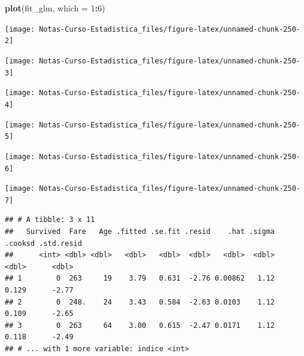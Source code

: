 \documentclass[
  12pt,
]{book}
\newenvironment{Shaded}{\begin{snugshade}}{\end{snugshade}}
\newcommand{\DataTypeTok}[1]{\textcolor[rgb]{0.13,0.29,0.53}{#1}}
\newcommand{\DecValTok}[1]{\textcolor[rgb]{0.00,0.00,0.81}{#1}}
\newcommand{\KeywordTok}[1]{\textcolor[rgb]{0.13,0.29,0.53}{\textbf{#1}}}
\newcommand{\NormalTok}[1]{#1}
\newcommand{\OperatorTok}[1]{\textcolor[rgb]{0.81,0.36,0.00}{\textbf{#1}}}
\newcommand{\StringTok}[1]{\textcolor[rgb]{0.31,0.60,0.02}{#1}}
\theoremstyle{definition}
\theoremstyle{definition}
\theoremstyle{definition}
\theoremstyle{remark}
\begin{document}
\begin{Shaded}
\begin{Highlighting}[]
\KeywordTok{plot}\NormalTok{(fit_glm, }\DataTypeTok{which =} \DecValTok{1}\OperatorTok{:}\DecValTok{6}\NormalTok{)}
\end{Highlighting}
\end{Shaded}

\begin{center}\texttt{[image: Notas-Curso-Estadistica\_files/figure-latex/unnamed-chunk-250-2]} \end{center}

\begin{center}\texttt{[image: Notas-Curso-Estadistica\_files/figure-latex/unnamed-chunk-250-3]} \end{center}

\begin{center}\texttt{[image: Notas-Curso-Estadistica\_files/figure-latex/unnamed-chunk-250-4]} \end{center}

\begin{center}\texttt{[image: Notas-Curso-Estadistica\_files/figure-latex/unnamed-chunk-250-5]} \end{center}

\begin{center}\texttt{[image: Notas-Curso-Estadistica\_files/figure-latex/unnamed-chunk-250-6]} \end{center}

\begin{center}\texttt{[image: Notas-Curso-Estadistica\_files/figure-latex/unnamed-chunk-250-7]} \end{center}

\begin{Shaded}
\end{Shaded}

\begin{verbatim}
## # A tibble: 3 x 11
##   Survived  Fare   Age .fitted .se.fit .resid    .hat .sigma .cooksd .std.resid
##      <int> <dbl> <dbl>   <dbl>   <dbl>  <dbl>   <dbl>  <dbl>   <dbl>      <dbl>
## 1        0  263     19    3.79   0.631  -2.76 0.00862   1.12   0.129      -2.77
## 2        0  248.    24    3.43   0.584  -2.63 0.0103    1.12   0.109      -2.65
## 3        0  263     64    3.00   0.615  -2.47 0.0171    1.12   0.118      -2.49
## # ... with 1 more variable: indice <int>
\end{verbatim}
\end{document}
